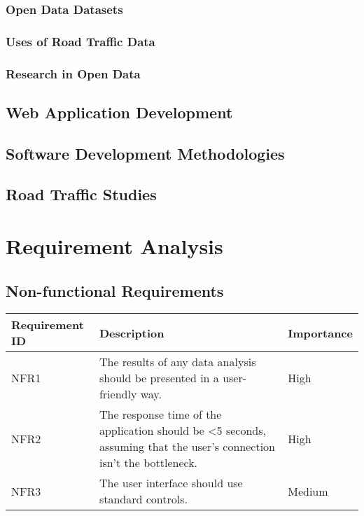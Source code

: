 \documentclass[authoryearcitations]{UoYCSproject}
\begin{document}

\subsection{Open Data Datasets}

\subsection{Uses of Road Traffic Data}

\subsection{Research in Open Data}

\section{Web Application Development}

\section{Software Development Methodologies}

\section{Road Traffic Studies}

\chapter{Requirement Analysis}

\section{Non-functional Requirements}

\begin{tabular}{| p{2.2cm} | p{7.5cm} | p{2cm} |}
	\hline
	\textbf{Requirement ID} & \textbf{Description} & \textbf{Importance} \\ \hline
	NFR1 & The results of any data analysis should be presented in a user-friendly way. & High \\ \hline
	NFR2 & The response time of the application should be <5 seconds, assuming that the user's connection isn't the bottleneck. & High \\ \hline
	NFR3 & The user interface should use standard controls. & Medium \\
	\hline
\end{tabular}
\end{document}
